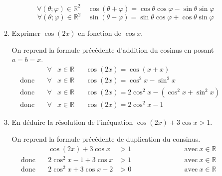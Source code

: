 \documentclass[a4paper,french,bookmarks]{article}
\begin{document}
\begin{enumerate}
\begin{enumerate}
   \begin{tcolorbox}[colback=black!3,colframe=black!9,boxrule=.25pt,enhanced,arc is angular,arc=0pt]
        
   \[\forall \left(\theta; \varphi\right) \in \mathbb{R}^2 \quad \cos \left(\theta + \varphi\right) = \cos \theta\cos \varphi - \sin \theta\sin \varphi\]
      \[\forall \left(\theta; \varphi\right) \in \mathbb{R}^2 \quad \sin \left(\theta + \varphi\right) = \sin \theta\cos \varphi + \cos \theta\sin \varphi\]
    \end{tcolorbox}
    
    \item Exprimer $\cos\left(2x\right)$ en fonction de $\cos x$.
    \begin{tcolorbox}[colback=black!3,colframe=black!9,boxrule=.25pt,enhanced,arc is angular,arc=0pt]
    On reprend la formule précédente d'addition du cosinus en posant $a = b = x$.
    \begin{align*}
     && \forall &x \in \mathbb{R} && \cos \left(2x\right) = \cos \left(x + x\right) &&\\
\text{donc} \ && \forall &x \in \mathbb{R} &&  \cos \left(2x\right) = \cos^2 x - \sin^2 x\\
\text{donc} \ && \forall &x \in \mathbb{R} &&  \cos \left(2x\right) = 2\cos^2 x - \left(\cos^2 x + \sin^2 x\right)\\
\text{donc} \ && \forall &x \in \mathbb{R} &&  \cos \left(2x\right) = 2\cos^2 x - 1
\end{align*}
    \end{tcolorbox}
    
    \item
    En déduire la résolution de l'inéquation $\cos\left(2x\right) + 3\cos x  > 1$.
    
    \begin{tcolorbox}[colback=black!3,colframe=black!9,boxrule=.25pt,enhanced,arc is angular,arc=0pt]
  On reprend la formule précédente de duplication du consinus.
    \begin{align*}
     && \cos\left(2x\right) + 3\cos x &> 1 &&\text{avec} \ x \in \mathbb{R}\\
\text{donc} \ && 2\cos^2 x - 1 + 3\cos x &> 1 \qquad\qquad\qquad&&\text{avec} \ x \in \mathbb{R}\qquad\\
\text{donc} \ && 2\cos^2 x  + 3\cos x -2 &> 0 &&\text{avec} \ x \in \mathbb{R}
\end{align*}


\end{tcolorbox}
\end{enumerate}
\end{enumerate}
\end{document}
